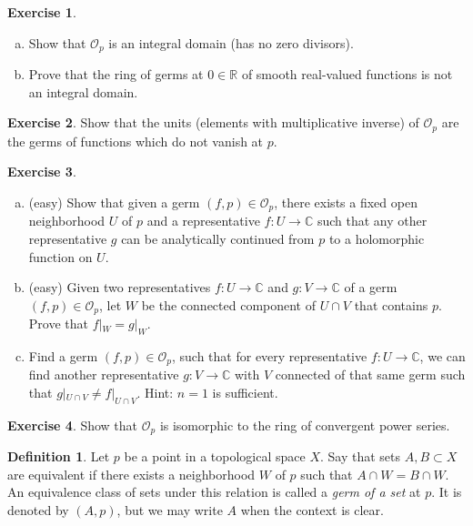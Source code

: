 \documentclass[12pt,openany]{book}
\newcommand{\C}{{\mathbb{C}}}
\newcommand{\R}{{\mathbb{R}}}
\newcommand{\sO}{{\mathscr{O}}}
\newcommand{\myindex}[1]{#1\index{#1}}
\theoremstyle{plain}
\theoremstyle{remark}
\theoremstyle{definition}
\newtheorem{defn}[thm]{Definition}
\newenvironment{exbox}{%
    \def\FrameCommand{\vrule width 1pt \relax\hspace{10pt}}%
    \MakeFramed{\advance\hsize-\width\FrameRestore}%
}{%
    \endMakeFramed
}
\newenvironment{exparts}{%
    \leavevmode\begin{enumerate}[a),noitemsep,topsep=0pt,parsep=0pt,partopsep=0pt]
}{%
    \end{enumerate}
}
\theoremstyle{exercise}
\newtheorem{exercise}{Exercise}[section]
\theoremstyle{example}
\begin{document}
\begin{exbox}
\begin{exercise}
\begin{exparts}
\item
Show that $\sO_p$ is an \myindex{integral domain} (has no zero divisors).
\item
Prove that the ring of germs at $0 \in \R$ of smooth real-valued functions
is not an integral domain.
\end{exparts}
\end{exercise}

\begin{exercise}
Show that the units (elements with multiplicative inverse)
of $\sO_p$ are the germs of functions which do not vanish at
$p$.
\end{exercise}

\begin{exercise}
\begin{exparts}
\item (easy)
Show that given a germ $(f,p) \in \sO_p$,
there exists a fixed open neighborhood $U$
of $p$ and a representative $f \colon U \to \C$ such that any other
representative $g$ can be analytically continued from $p$ to a holomorphic
function on $U$.
\item
(easy) Given two representatives $f \colon U \to \C$
and $g \colon V \to \C$ of a germ $(f,p) \in \sO_p$,
let $W$ be the connected component of $U \cap V$
that contains $p$.  Prove that $f|_W = g|_W$.
\item
Find a germ $(f,p) \in \sO_p$, such that for
every representative $f \colon U \to \C$, we can
find another representative $g \colon V \to \C$ with $V$ connected
of that same germ such that $g|_{U \cap V} \neq f|_{U \cap V}$.
Hint: $n=1$ is sufficient.
\end{exparts}
\end{exercise}

\begin{exercise}
Show that $\sO_p$ is isomorphic to the ring of convergent power series.
\end{exercise}
\end{exbox}


\begin{defn}
Let $p$ be a point in a topological space $X$.
Say that sets $A, B \subset X$ are equivalent
if there exists a neighborhood $W$ of $p$
such that $A \cap W = B \cap W$.
An equivalence class of sets under this relation
is called a \emph{\myindex{germ of a set}} at $p$.
%
It is denoted by $(A,p)$, but we may write $A$ when
the context is clear.
\end{defn}
\end{document}
